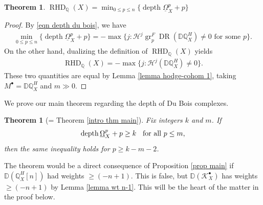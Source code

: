 \documentclass[11pt]{amsart}
\newtheorem{theorem}[equation]{Theorem}
\theoremstyle{definition}
\theoremstyle{plain}
\newcounter{intro}
\DeclareMathOperator{\gr}{gr}
\DeclareMathOperator{\dr}{DR}
\DeclareMathOperator{\depth}{depth}
\DeclareMathOperator{\RHD}{RHD}
\begin{document}
\begin{theorem}\label{thm lcdef depth body}
$\RHD_\mathbb{Q}(X) = \min_{0 \leq p \leq n} \{ \depth \underline{\Omega}_X^p + p \}$
\end{theorem}

\begin{proof}
By \ref{eqn depth du bois}, we have
\begin{align*}
    \min_{0 \leq p \leq n} \{ \depth \underline{\Omega}_X^p + p \} = 
    - \max \{ j : \mathcal{H}^j \gr_p^F \dr( \mathbb{D}\mathbb{Q}_X^H ) \neq 0 \text{ for some } p \}.
\end{align*}
On the other hand, dualizing the definition of $\RHD_\mathbb{Q}(X)$ yields
\begin{align*}
    \RHD_\mathbb{Q}(X) = - \max\{ j : \mathcal{H}^j( \mathbb{D}\mathbb{Q}_X^H) \neq 0 \}.
\end{align*}
These two quantities are equal by Lemma \ref{lemma hodge-cohom 1}, taking $M^\bullet = \mathbb{D}\mathbb{Q}_X^H$ and $m \gg 0$.
\end{proof}

We prove our main theorem regarding the depth of Du Bois complexes.

\begin{theorem}[= Theorem \ref{intro thm main}]\label{thm main}
Fix integers $k$ and $m$. If
\begin{align*}
    \depth \underline{\Omega}_X^p + p \geq k \hspace{.2cm} \text{ for all } p \leq m,
\end{align*}
then the same inequality holds for $p \geq k-m-2$.
\end{theorem}

The theorem would be a direct consequence of Proposition \ref{prop main} if $\mathbb{D} (\mathbb{Q}_X^H[n])$ had weights $\geq (-n+1)$. This is false, but $\mathbb{D} (\mathcal{K}_X^\bullet)$ has weights $\geq (-n+1)$ by Lemma \ref{lemma wt n-1}. This will be the heart of the matter in the proof below.
\end{document}
